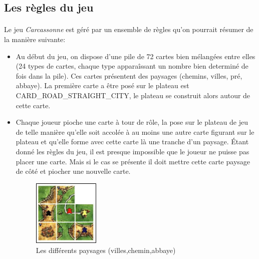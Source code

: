 \documentclass[12pt]{article}
\begin{document}
\subsection{Les règles du jeu}

\paragraph{} Le jeu \textit{Carcassonne} est géré par un ensemble de règles qu'on pourrait résumer de la manière suivante:

\begin{itemize}

\item Au début du jeu, on dispose d'une pile de 72 cartes bien mélangées entre elles (24 types de cartes, chaque type apparaîssant un nombre bien determiné de fois dans la pile). Ces cartes présentent des paysages (chemins, villes, pré, abbaye). La première carte a être posé sur le plateau est CARD\_ROAD\_STRAIGHT\_CITY, le plateau se construit alors autour de cette carte.

\item Chaque joueur pioche une carte à tour de rôle, la pose sur le plateau de jeu de telle manière qu'elle soit accolée à au moins une autre carte figurant sur le plateau et qu'elle forme avec cette carte là une tranche d'un paysage. Étant donné les règles du jeu, il est presque impossible que le joueur ne puisse pas placer une carte. Mais si le cas se présente il doit mettre cette carte paysage de côté et piocher une nouvelle carte.\\

\begin{figure}
	\begin{center}
	\includegraphics[width=0.3\textwidth]{completer.jpg}
	\end{center}
    \caption{Les différents paysages (villes,chemin,abbaye)} \label{figure1}
\end{figure}


\end{itemize}
\end{document}
